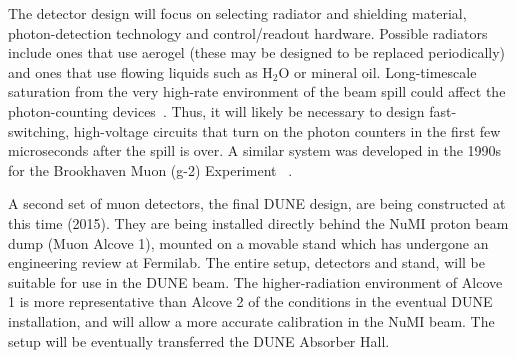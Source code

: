 The detector design will focus on selecting radiator and shielding
material, photon-detection technology and control/readout
hardware. Possible radiators include ones that use aerogel (these may be designed to
be replaced periodically) and ones that use flowing liquids such as H$_2$O or
mineral oil. Long-timescale saturation from the very high-rate
environment of the beam spill could affect the photon-counting
devices~\cite{ref:HighRateCounting}. Thus, it will likely be necessary
to design fast-switching, high-voltage circuits that turn on the
photon counters in the first few microseconds after the spill is
over. A similar system was developed in the 1990s for the Brookhaven
Muon (g-2) Experiment~\cite{ref:G2} .

A second set of muon detectors, the final 
DUNE design, are being
constructed at this time (2015). They are being installed directly
behind the NuMI proton beam dump (Muon Alcove 1), mounted on a movable stand which has undergone an engineering
review at Fermilab. 
%
The entire setup, detectors and stand, will be
suitable for use in the DUNE beam. The higher-radiation environment of Alcove 1 is more representative %
than Alcove 2 of the conditions in the eventual DUNE installation, and will 
allow a more accurate calibration in the NuMI
beam. The setup will be eventually transferred the DUNE Absorber Hall. 
